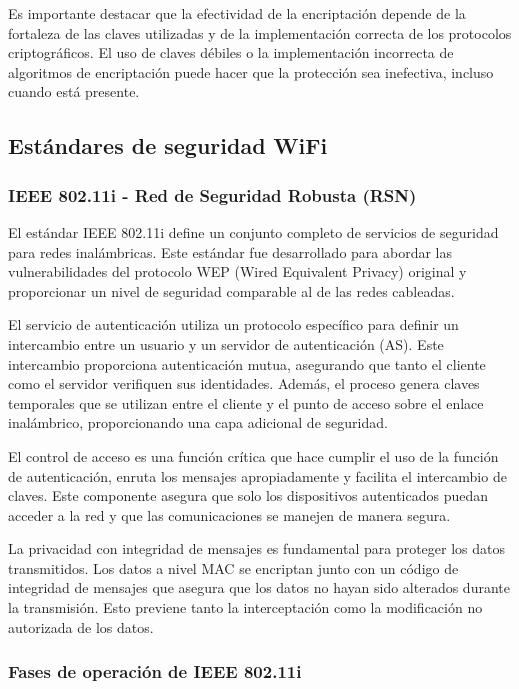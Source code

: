 Es importante destacar que la efectividad de la encriptación depende de la fortaleza de las claves utilizadas y de la implementación correcta de los protocolos criptográficos. El uso de claves débiles o la implementación incorrecta de algoritmos de encriptación puede hacer que la protección sea inefectiva, incluso cuando está presente.

\subsection{Estándares de seguridad WiFi}

\subsubsection{IEEE 802.11i - Red de Seguridad Robusta (RSN)}

El estándar IEEE 802.11i define un conjunto completo de servicios de seguridad para redes inalámbricas. Este estándar fue desarrollado para abordar las vulnerabilidades del protocolo WEP (Wired Equivalent Privacy) original y proporcionar un nivel de seguridad comparable al de las redes cableadas.

El servicio de autenticación utiliza un protocolo específico para definir un intercambio entre un usuario y un servidor de autenticación (AS). Este intercambio proporciona autenticación mutua, asegurando que tanto el cliente como el servidor verifiquen sus identidades. Además, el proceso genera claves temporales que se utilizan entre el cliente y el punto de acceso sobre el enlace inalámbrico, proporcionando una capa adicional de seguridad.

El control de acceso es una función crítica que hace cumplir el uso de la función de autenticación, enruta los mensajes apropiadamente y facilita el intercambio de claves. Este componente asegura que solo los dispositivos autenticados puedan acceder a la red y que las comunicaciones se manejen de manera segura.

La privacidad con integridad de mensajes es fundamental para proteger los datos transmitidos. Los datos a nivel MAC se encriptan junto con un código de integridad de mensajes que asegura que los datos no hayan sido alterados durante la transmisión. Esto previene tanto la interceptación como la modificación no autorizada de los datos.

\subsubsection{Fases de operación de IEEE 802.11i}


